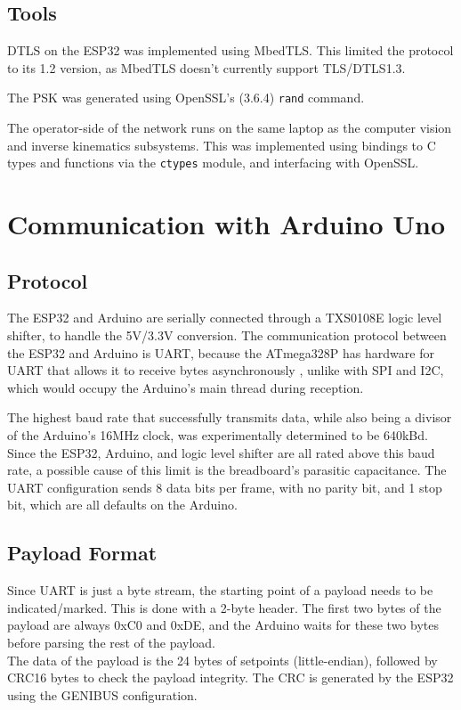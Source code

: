 \subsection{Tools}
DTLS on the ESP32 was implemented using MbedTLS. This limited the protocol to its 1.2 version, as MbedTLS doesn't currently support TLS/DTLS1.3.

The PSK was generated using OpenSSL's (3.6.4) \verb|rand| command.

The operator-side of the network runs on the same laptop as the computer vision and inverse kinematics subsystems. This was implemented using bindings to C types and functions via the \verb|ctypes| module, and interfacing with OpenSSL.

\newpage
\section{Communication with Arduino Uno}

\subsection{Protocol}
The ESP32 and Arduino are serially connected through a TXS0108E logic level shifter, to handle the 5V/3.3V conversion. The communication protocol between the ESP32 and Arduino is UART, because the ATmega328P has hardware for UART that allows it to receive bytes asynchronously \cite{bib:ATmega328P}, unlike with SPI and I2C, which would occupy the Arduino's main thread during reception.

The highest baud rate that successfully transmits data, while also being a divisor of the Arduino's 16MHz clock, was experimentally determined to be 640kBd. Since the ESP32, Arduino, and logic level shifter are all rated above this baud rate, a possible cause of this limit is the breadboard's parasitic capacitance. The UART configuration sends 8 data bits per frame, with no parity bit, and 1 stop bit, which are all defaults on the Arduino.

\subsection{Payload Format}
Since UART is just a byte stream, the starting point of a payload needs to be indicated/marked. This is done with a 2-byte header. The first two bytes of the payload are always 0xC0 and 0xDE, and the Arduino waits for these two bytes before parsing the rest of the payload.\\
The data of the payload is the 24 bytes of setpoints (little-endian), followed by CRC16 bytes to check the payload integrity. The CRC is generated by the ESP32 using the GENIBUS configuration.

